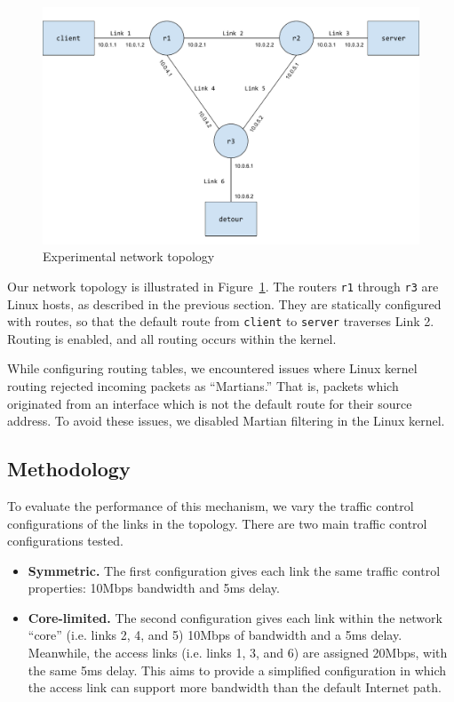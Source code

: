 \documentclass{cwru}
\begin{document}
\begin{figure}
  \centering
  \includegraphics[width=\textwidth]{figures/Topology.pdf}
  \caption{Experimental network topology}
  \label{fig:topo}
\end{figure}

Our network topology is illustrated in Figure~\ref{fig:topo}. The routers
\texttt{r1} through \texttt{r3} are Linux hosts, as described in the previous
section. They are statically configured with routes, so that the default route
from \texttt{client} to \texttt{server} traverses Link 2. Routing is enabled,
and all routing occurs within the kernel.

While configuring routing tables, we encountered issues where Linux kernel
routing rejected incoming packets as ``Martians.'' That is, packets which
originated from an interface which is not the default route for their source
address. To avoid these issues, we disabled Martian filtering in the Linux
kernel.

\subsection{Methodology}

To evaluate the performance of this mechanism, we vary the traffic control
configurations of the links in the topology. There are two main traffic control
configurations tested.

\begin{itemize}
\item \textbf{Symmetric.} The first configuration gives each link the same
  traffic control properties: 10Mbps bandwidth and 5ms delay.
\item \textbf{Core-limited.} The second configuration gives each link within the
  network ``core'' (i.e. links 2, 4, and 5) 10Mbps of bandwidth and a 5ms delay.
  Meanwhile, the access links (i.e. links 1, 3, and 6) are assigned 20Mbps, with
  the same 5ms delay. This aims to provide a simplified configuration in which
  the access link can support more bandwidth than the default Internet path.
\end{itemize}
\end{document}
